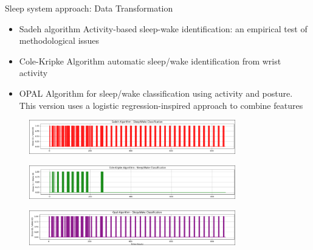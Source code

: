\documentclass[10pt]{beamer} %
\begin{document}
\begin{frame}{Sleep system approach: Data Transformation  } %
\begin{itemize}
    \item \footnotesize Sadeh algorithm Activity-based sleep-wake identification: an empirical test of methodological issues
    \item \footnotesize Cole-Kripke Algorithm automatic sleep/wake identification from wrist activity
    \item \footnotesize OPAL Algorithm for sleep/wake classification using activity and posture.
	This version uses a logistic regression-inspired approach to combine features
\end{itemize}
    \begin{figure}[htb]
    \centering
    \includegraphics[width=0.8\textwidth]{figures/sadeh_result.png}
    \end{figure}
    \begin{figure}[htb]
    \centering
    \includegraphics[width=0.8\textwidth]{figures/Cole_result.png}
    \end{figure}
    \begin{figure}[htb]
    \centering
    \includegraphics[width=0.8\textwidth]{figures/Opal_result.png}
    \end{figure}

\end{frame}
\end{document}
